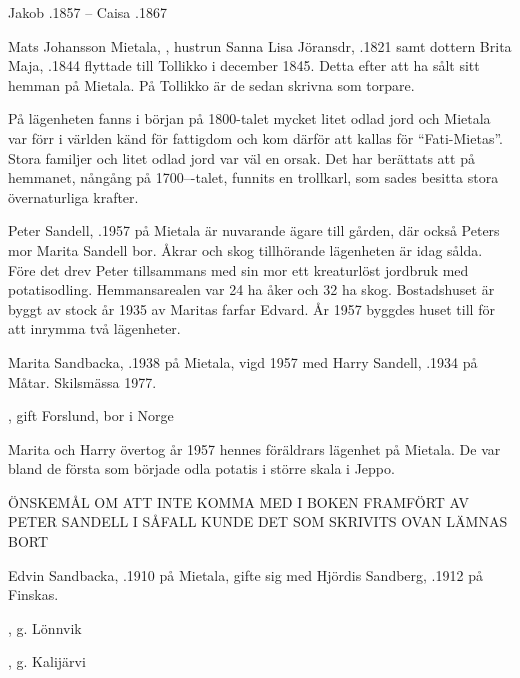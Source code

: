 Jakob .1857  --  Caisa .1867


Mats Johansson Mietala, , hustrun Sanna Lisa Jöransdr, .1821 samt dottern Brita Maja,  .1844 flyttade till Tollikko i december 1845. Detta efter att ha sålt sitt hemman på Mietala. På Tollikko är de sedan skrivna som torpare.

På lägenheten fanns i början på 1800-talet mycket litet odlad jord och Mietala var förr i världen känd för fattigdom och kom därför att kallas för ``Fati-Mietas''. Stora familjer och litet odlad jord var väl en orsak. Det har berättats att på hemmanet, nångång på 1700---talet, funnits en trollkarl, som sades besitta stora övernaturliga krafter.






Peter Sandell, .1957 på Mietala är nuvarande ägare till gården, där också Peters mor Marita Sandell bor. Åkrar och skog tillhörande lägenheten är idag sålda. Före det drev Peter tillsammans med sin mor ett kreaturlöst jordbruk med potatisodling. Hemmansarealen var 24 ha åker och 32 ha skog. Bostadshuset är byggt av stock år 1935 av Maritas farfar Edvard. År 1957 byggdes huset till för att inrymma två lägenheter.


Marita  Sandbacka, .1938 på Mietala, vigd 1957 med Harry Sandell, .1934 på Måtar. Skilsmässa 1977.
\begin{jhchildren}
  \item {}
  \item {}, gift Forslund, bor i Norge
\end{jhchildren}
Marita och Harry övertog år 1957 hennes föräldrars lägenhet på Mietala. De var bland de första som började odla potatis i större skala i Jeppo.

ÖNSKEMÅL OM ATT INTE KOMMA MED I BOKEN FRAMFÖRT AV PETER SANDELL I SÅFALL KUNDE  DET SOM SKRIVITS OVAN LÄMNAS BORT


Edvin Sandbacka, .1910 på Mietala, gifte sig med Hjördis Sandberg, .1912 på Finskas.
\begin{jhchildren}
  \item {}, g. Lönnvik
  \item {}
  \item {}, g. Kalijärvi
\end{jhchildren}

